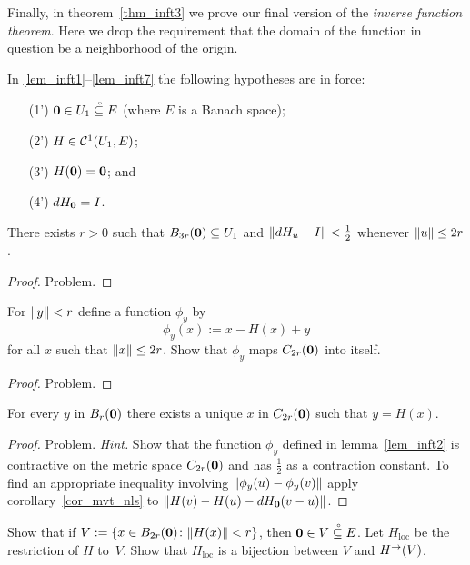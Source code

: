 Finally, in theorem~\ref{thm_inft3} we prove our final version of
the \emph{inverse function theorem}.  Here we drop the requirement
that the domain of the function in question be a neighborhood of
the origin.

In \ref{lem_inft1}--\ref{lem_inft7} the following hypotheses are in
force:
 \begin{enumerate}
  \item[(1')] $\mathbf{0} \in U_1\overset{\thickspace{}_\circ}{\subseteq}E$ (where $E$ is a Banach space);
  \item[(2')] $H \in \mathcal{C}^1(U_1,E)$;
  \item[(3')] $H(\mathbf{0}) = \mathbf{0}$; and
  \item[(4')] $dH_{\mathbf{0}} = I$.
 \end{enumerate}

\begin{lem}\label{lem_inft1}  There exists $r > 0$ such that $B_{3r}(\mathbf{0}) \subseteq U_1$ and
$\lVert dH_u - I\rVert < \frac12$ whenever $\lVert u\rVert \le 2r$.
\end{lem}

\begin{proof} Problem.   \ns  \end{proof}

\begin{lem}\label{lem_inft2}  For $\lVert y\rVert < r$ define a function $\phi_y$ by
  \[ \phi_y(x) := x - H(x) + y \]
for all $x$ such that $\lVert x\rVert \le 2r$.  Show that $\phi_y$ maps $C_{2r}(\mathbf{0})$ into itself.
\end{lem}

\begin{proof} Problem.   \ns  \end{proof}

\begin{lem}\label{lem_inft3} For every $y$ in $B_r(\mathbf{0})$ there exists a unique $x$ in
$C_{2r}(\mathbf{0})$ such that $y = H(x)$.
\end{lem}

\begin{proof} Problem.  \emph{Hint.}  Show that the function $\phi_y$ defined in
lemma~\ref{lem_inft2} is contractive on the metric space $C_{2r}(\mathbf{0})$ and has $\frac12$ as
a contraction constant.  To find an appropriate inequality involving $\lVert\phi_y(u) -
\phi_y(v)\rVert$ apply corollary~\ref{cor_mvt_nls} to $\lVert H(v) - H(u) - dH_{\mathbf{0}}(v - u)\rVert$.
\ns
\end{proof}

\begin{lem}\label{lem_inft4} Show that if $V := \{x \in B_{2r}(\mathbf{0}) \colon \lVert H(x)\rVert < r\}$,
then $\mathbf{0} \in V\overset{\thickspace{}_\circ}{\subseteq}E$.  Let $H_{\text{loc}}$ be the restriction of $H$ to~$V$.  Show that
$H_{\text{loc}}$ is a bijection between $V$ and $H^{\rightarrow}(V)$.
\end{lem}

